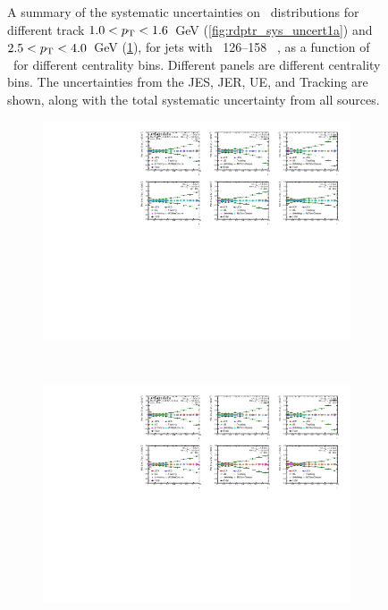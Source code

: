 \begin{figure}
\begin{subfigure}[b]{\textwidth}
    \caption{}
    \label{fig:rdptr_sys_uncert1b}
\end{subfigure}\hfill
   \caption{A summary of the systematic uncertainties on \RDptr\ distributions for different track \mbox{$1.0 < \mbox{$p_{\mathrm{T}}$} < 1.6$ GeV} (\ref{fig:rdptr_sys_uncert1a}) and \mbox{$2.5 < \mbox{$p_{\mathrm{T}}$} < 4.0$ GeV} (\ref{fig:rdptr_sys_uncert1b}), for jets with \pt\ 126--158 \GeV\ , as a function of \rvar\ for different centrality bins.
Different panels are different centrality bins.
The uncertainties from the JES, JER, UE, and Tracking  are shown, along with the total systematic uncertainty from all sources.
}
\label{fig:rdptr_sys_uncert1}
\end{figure}


\begin{figure}
\centering
\begin{subfigure}[b]{\textwidth}
    \centering
    \includegraphics[page=5, width=\textwidth]{figures/main/systematics/Summary_ChPS_dR_sys_PbPb_error}
    \caption{}
    \label{fig:rdptr_sys_uncert2a}
\end{subfigure} \\
\begin{subfigure}[b]{\textwidth}
    \centering
    \includegraphics[page=6, width=\textwidth]{figures/main/systematics/Summary_ChPS_dR_sys_PbPb_error}

\end{subfigure}
\end{figure}
